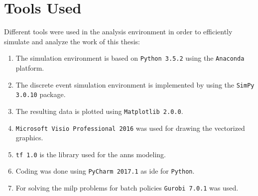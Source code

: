 \chapter{Tools Used}

Different tools were used in the analysis environment in order to efficiently simulate and analyze the work of this thesis:

\begin{enumerate}
	\item The simulation environment is based on \texttt{Python 3.5.2} using the \texttt{Anaconda} platform.
	\item The discrete event simulation environment is implemented by using the \texttt{SimPy 3.0.10} package.
	\item The resulting data is plotted using \texttt{Matplotlib 2.0.0}.
	\item \texttt{Microsoft Visio Professional 2016} was used for drawing the vectorized graphics.
	\item \texttt{\gls{tf} 1.0} is the library used for the \glspl{ann} modeling.
	\item Coding was done using \texttt{PyCharm 2017.1} as \gls{ide} for \texttt{Python}.
	\item For solving the \gls{milp} problems for batch policies \texttt{Gurobi 7.0.1} was used.
\end{enumerate}